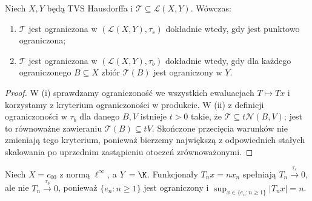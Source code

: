 \begin{stwierdzenie}
\label{prop:op-family-bounded}
Niech $X,Y$ będą TVS Hausdorffa i
$\mathcal T\subseteq\mathcal L(X,Y)$. Wówczas:
\begin{enumerate}[label=\textup{(\roman*)}]
\item $\mathcal T$ jest ograniczona w $(\mathcal L(X,Y),\tau_s)$
dokładnie wtedy, gdy jest punktowo ograniczona;
\item $\mathcal T$ jest ograniczona w $(\mathcal L(X,Y),\tau_b)$
dokładnie wtedy, gdy dla każdego ograniczonego $B\subseteq X$
zbiór $\mathcal T(B)$ jest ograniczony w $Y$.
\end{enumerate}
\end{stwierdzenie}
\begin{proof}
W (i) sprawdzamy ograniczoność we wszystkich ewaluacjach
$T\mapsto Tx$ i korzystamy z kryterium ograniczoności
w produkcie. W (ii) z definicji ograniczoności w
$\tau_b$ dla danego $B,V$ istnieje $t>0$ takie,
że $\mathcal T\subseteq t\mathcal N(B,V)$; jest to
równoważne zawieraniu $\mathcal T(B)\subseteq tV$.
Skończone przecięcia warunków nie zmieniają tego kryterium,
ponieważ bierzemy największą z odpowiednich stałych
skalowania po uprzednim zastąpieniu otoczeń zrównoważonymi.
\end{proof}

\begin{przyklad}
Niech $X=c_{00}$ z normą $\ell^\infty$, a $Y=\K$.
Funkcjonały $T_nx=nx_n$ spełniają
$T_n\xrightarrow{\tau_s}0$, ale nie
$T_n\xrightarrow{\tau_b}0$, ponieważ
$\{e_n:n\ge1\}$ jest ograniczony i
$\sup_{x\in\{e_n:n\ge1\}}|T_nx|=n$.
\end{przyklad}

